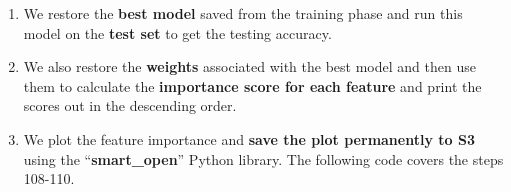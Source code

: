 \documentclass[]{book}
\providecommand{\tightlist}{%
  \setlength{\itemsep}{0pt}\setlength{\parskip}{0pt}}
\begin{document}
\begin{enumerate}
\def\labelenumi{\arabic{enumi}.}
\setcounter{enumi}{107}
\tightlist
\item
  We restore the \textbf{best model} saved from the training phase and run this model on the \textbf{test set} to get the testing accuracy.
\item
  We also restore the \textbf{weights} associated with the best model and then use them to calculate the \textbf{importance score for each feature} and print the scores out in the descending order.
\item
  We plot the feature importance and \textbf{save the plot permanently to S3} using the ``\textbf{smart\_open}'' Python library. The following code covers the steps 108-110.
\end{enumerate}
\end{document}
